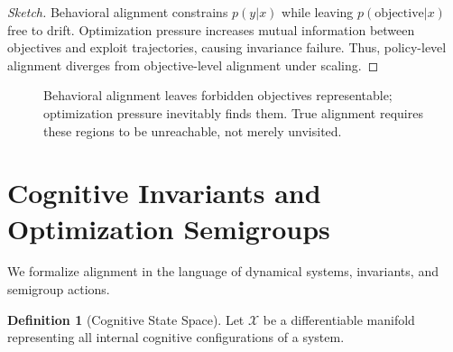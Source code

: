 \documentclass[11pt,a4paper]{article}
\theoremstyle{plain}
\theoremstyle{definition}
\newtheorem{definition}[theorem]{Definition}
\theoremstyle{remark}
\numberwithin{equation}{section}
\newcommand{\X}{\mathcal{X}}
\begin{document}
\begin{proof}[Sketch]
Behavioral alignment constrains $p(y|x)$ while leaving $p(\text{objective}|x)$ free to drift. Optimization pressure increases mutual information between objectives and exploit trajectories, causing invariance failure. Thus, policy-level alignment diverges from objective-level alignment under scaling.
\end{proof}

\begin{figure}[H]
\centering
{}
\caption{Behavioral alignment leaves forbidden objectives representable; optimization pressure inevitably finds them. True alignment requires these regions to be unreachable, not merely unvisited.}
\end{figure}


\section{Cognitive Invariants and Optimization Semigroups}

We formalize alignment in the language of dynamical systems, invariants, and semigroup actions.

\begin{definition}[Cognitive State Space]
Let $\X$ be a differentiable manifold representing all internal cognitive configurations of a system.
\end{definition}
\end{document}
